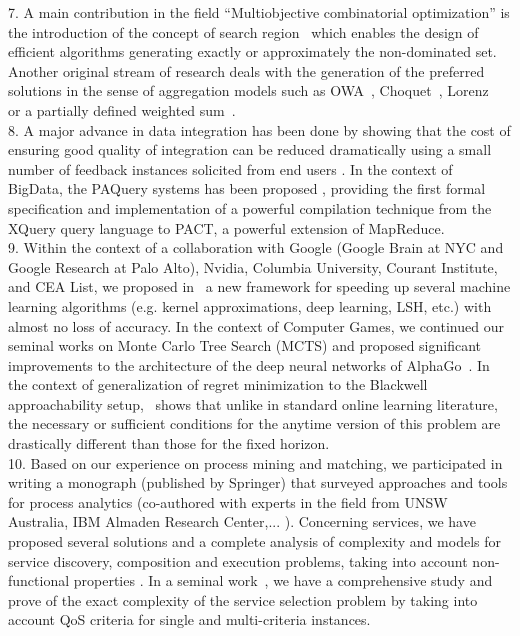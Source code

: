 7. A main contribution in the field ``Multiobjective combinatorial optimization'' is the introduction of the concept of search region~\cite{Klamroth2015On-634730,Dachert2017Efficient-1250848} which enables the design of efficient algorithms generating exactly or approximately the non-dominated set.  Another original stream of research deals with the generation of the preferred solutions in the sense of aggregation models such as OWA~\cite{Galand2012Exact-610325}, Choquet~\cite{DBLP:conf/ijcai/GalandLP13}, Lorenz~\cite{Galand2015Exact-1052488} or a partially defined weighted sum~\cite{Kaddani2017Weighted-1232001}. \\
8. A major advance in data integration has been done by showing that the cost of ensuring good quality of integration can be reduced dramatically using a small number of feedback instances solicited from end users \cite{Belhajjame2013Incrementally-904545,DBLP:journals/dpd/BelhajjamePHF15}. In the context of BigData, the PAQuery systems has been proposed \cite{DBLP:conf/sigmod/Camacho-RodriguezCM14, DBLP:journals/tkde/Camacho-Rodriguez15}, providing the first formal specification and implementation of a powerful compilation technique from the XQuery query language to PACT, a powerful extension of MapReduce. \\
9. Within the context of a collaboration with Google (Google Brain at NYC and Google Research at Palo Alto), Nvidia, Columbia University, Courant Institute, and CEA List, we proposed in~\cite{Bojarski2017Structured-1259771} a new framework for speeding up several machine learning algorithms (e.g. kernel approximations, deep learning, LSH, etc.) with almost no loss of accuracy. In the context of Computer Games, we continued our seminal works on Monte Carlo Tree Search (MCTS) and proposed significant improvements to the architecture of the deep neural networks of AlphaGo~\cite{cazenave2017residual}. In the context of generalization of regret minimization to the Blackwell approachability setup,~\cite{FLP2016} shows that unlike in standard online learning literature, the necessary or sufficient conditions for the anytime version of this problem are drastically different than those for the fixed horizon. \\
10. Based on our experience on process mining and matching, we participated in writing a monograph (published by Springer) \cite{DBLP:books/sp/BeheshtiBSGMBGR16} that surveyed approaches and tools for process analytics (co-authored with experts in the field from UNSW Australia, IBM Almaden Research Center,... ). Concerning services, we have proposed several solutions and a complete analysis of complexity and models for service discovery, composition and execution problems, taking into account non-functional properties  \cite{GMMM17, AngaritaArocha2016Modeling-1159056}. In a seminal work~\cite{Abu-Khzam2015On-1017005}, we have a comprehensive study and prove of the exact complexity of the service selection problem by taking into account QoS criteria for single and multi-criteria instances.\\
